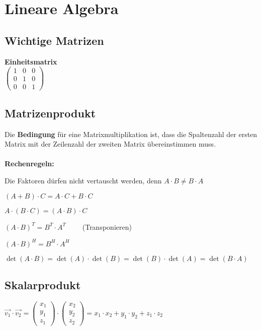\section{Lineare Algebra}

\subsection{Wichtige Matrizen}
\textbf{Einheitsmatrix}\\
$
\left(\begin{array}{ccc}
	1 & 0 & 0\\
	0 & 1 & 0\\
	0 & 0 & 1
\end{array}\right)
$

\subsection{Matrizenprodukt}
Die \textbf{Bedingung} für eine Matrixmultiplikation ist, dass die Spaltenzahl der ersten Matrix mit der Zeilenzahl der zweiten Matrix übereinstimmen muss.\\[10pt]
\\[10pt]
%
\textbf{Rechenregeln:}
\begin{compactitem}
	\item Die Faktoren dürfen nicht vertauscht werden, denn	$A\cdot B \ne B\cdot A$
	\item $(A + B) \cdot C = A \cdot C + B \cdot C$
	\item $A \cdot(B \cdot C)=(A \cdot B) \cdot C$
	\item $(A \cdot B)^{T}=B^{T} \cdot A^{T} \qquad$ (Transponieren)
	\item $(A \cdot B)^{H}=B^{H} \cdot A^{H}$
	\item $\operatorname{det}(A \cdot B)=\operatorname{det}(A) \cdot \operatorname{det}(B)=\operatorname{det}(B) \cdot \operatorname{det}(A)=\operatorname{det}(B \cdot A)$
\end{compactitem}

\subsection{Skalarprodukt}
$\overrightarrow{v_{1}} \cdot \overrightarrow{v_{2}}=\left(\begin{array}{l}
x_{1} \\
y_{1} \\
z_{1}
\end{array}\right) \cdot\left(\begin{array}{l}
x_{2} \\
y_{2} \\
z_{2}
\end{array}\right)=x_{1} \cdot x_{2}+y_{1} \cdot y_{2}+z_{1} \cdot z_{2}$\\[10pt]

